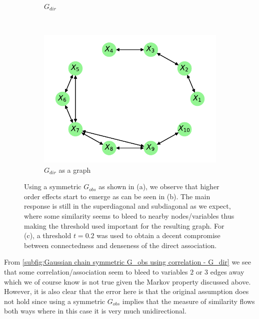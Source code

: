 \documentclass[../Thesis.tex]{subfiles}
\begin{document}
\begin{figure}[H]
\begin{subfigure}[t]{0.49\textwidth}
        \caption{$G_{dir}$}
        \label{subfig:Gaussian chain symmetric G_obs using correlation - G_dir}
    \end{subfigure}
    \\[\baselineskip]
    \begin{subfigure}[t]{0.49\textwidth}
        \centering
        \includegraphics[width=.9\linewidth]{figures/Gaussian Chain Theoretical/Chain graph from symmetric G obs.pdf}
        \caption{$G_{dir}$ as a graph}
    \end{subfigure}
    \caption{Using a symmetric $G_{obs}$ as shown in (a), we observe that higher order effects start to emerge as can be seen in (b). The main response is still in the superdiagonal and subdiagonal as we expect, where some similarity seems to bleed to nearby nodes/variables thus making the threshold used important for the resulting graph. For (c), a threshold $t=0.2$ was used to obtain a decent compromise between connectedness and denseness of the direct association.}
    \label{fig:Gaussian chain symmetric G_obs using correlation}
\end{figure}
From \autoref{subfig:Gaussian chain symmetric G_obs using correlation - G_dir} we see that some correlation/association seem to bleed to variables $2$ or $3$ edges away which we of course know is not true given the Markov property discussed above. However, it is also clear that the error here is that the original assumption does not hold since using a symmetric $G_{obs}$ implies that the measure of similarity flows both ways where in this case it is very much unidirectional.
\end{document}
